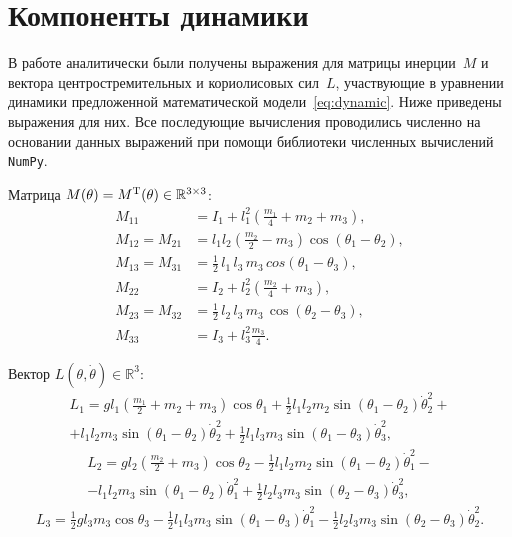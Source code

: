 \documentclass[../../doc.tex]{subfiles}
\begin{document}
    \section{Компоненты динамики}

    В работе аналитически были получены выражения для матрицы инерции~$M$ и вектора центростремительных и кориолисовых сил~$L$,
        участвующие в уравнении динамики предложенной математической модели~\eqref{eq:dynamic}.
    Ниже приведены выражения для них. Все последующие вычисления проводились численно
        на основании данных выражений
        при помощи библиотеки численных вычислений \texttt{NumPy}.

    Матрица $M(\theta) = M^\textnormal{T}(\theta) \in \mathbb{R}^{3 \times 3}$:
    \begin{equation*}
        \begin{aligned}
            M_{11} &= I_1 + l_1^2 \left(\frac{m_1}{4} + m_2 + m_3\right),
            \\
            M_{12} = M_{21} &= l_1 l_2 \left(\frac{m_2}{2} - m_3\right)\cos(\theta_1 - \theta_2),
            \\
            M_{13} = M_{31} &= \frac{1}{2}\,l_1\,l_3\,m_3\,cos(\theta_1 - \theta_3),
            \\
            M_{22} &= I_2 + l_2^2 \left(\frac{m_2}{4} + m_3\right),
            \\
            M_{23} = M_{32} &= \frac{1}{2}\,l_2\,l_3\,m_3\,\cos(\theta_2 - \theta_3),
            \\
            M_{33} &= I_3 + l_3^2\frac{m_3}{4}.
        \end{aligned}
    \end{equation*}

    Вектор $L(\theta, \dot \theta) \in \mathbb{R}^{3}$:
    \begin{multline*}
        L_1 = g l_1 \left( \frac{m_1}{2} + m_2 + m_3\right) \cos\theta_1 
                    +
                    \frac{1}{2}l_1 l_2 m_2 \sin(\theta_1 - \theta_2) \dot \theta_2^2
                    +\\+
                    l_1 l_2 m_3 \sin(\theta_1 - \theta_2) \dot\theta_2^2
                    +
                    \frac{1}{2}l_1 l_3 m_3 \sin(\theta_1 - \theta_3) \dot\theta_3^2,
    \end{multline*}
    \begin{multline*}
        L_2 = g l_2 \left( \frac{m_2}{2} + m_3 \right) \cos\theta_2
            - \frac{1}{2} l_1 l_2 m_2 \sin(\theta_1 - \theta_2) \dot\theta_1^2
            -\\- l_1 l_2 m_3 \sin(\theta_1 - \theta_2)\dot\theta_1^2
            + \frac{1}{2} l_2 l_3 m_3 \sin(\theta_2 - \theta_3)\dot\theta_3^2,
    \end{multline*}
    \begin{multline*}
        L_3 = \frac{1}{2}g l_3 m_3 \cos\theta_3
            - \frac{1}{2} l_1 l_3 m_3 \sin(\theta_1 - \theta_3) \dot \theta_1^2
            - \frac{1}{2} l_2 l_3 m_3 \sin(\theta_2 - \theta_3) \dot\theta_2^2.
    \end{multline*}
\end{document}
